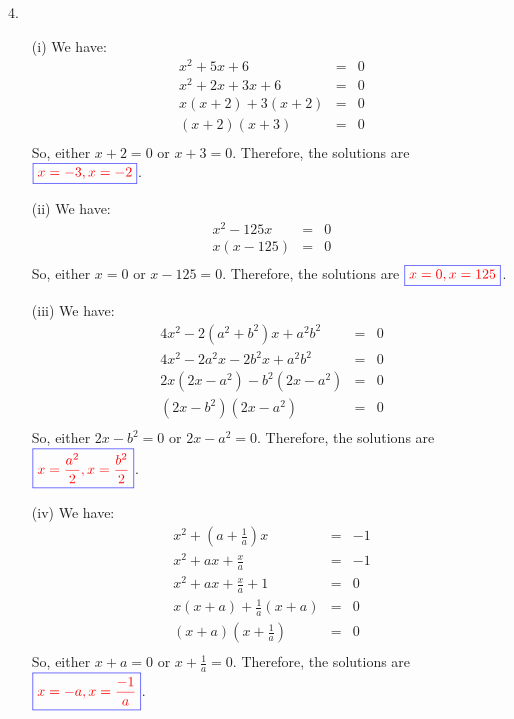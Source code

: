 \documentclass[addpoints, 12pt]{exam}
\theoremstyle{remark}
\begin{document}
4.
\begin{enumerate}
    \item [(i)] We have:
    \begin{eqnarray*}
        x^2 + 5x + 6 & = & 0 \\
        x^2 + 2x + 3x + 6 & = & 0 \\
        x(x+2) + 3(x+2) & = & 0 \\
        (x+2)(x+3) & = & 0 \\
    \end{eqnarray*}
    So, either $x+2=0$ or $x+3=0$. Therefore, the solutions are {\boldmath $\textcolor{blue}{\boxed{\textcolor{red}{x = -3,x= -2}}}$}.

    \item[(ii)] We have:
    \begin{eqnarray*}
        x^2 - 125x & = & 0 \\
        x(x-125) & = & 0 \\
    \end{eqnarray*}
    So, either $x=0$ or $x-125=0$. Therefore, the solutions are {\boldmath $\textcolor{blue}{\boxed{\textcolor{red}{x = 0,x= 125}}}$}.

    \item[(iii)] We have:
    \begin{eqnarray*}
        4x^2 - 2(a^2+b^2)x + a^2b^2 & = & 0 \\
        4x^2 - 2a^2x - 2b^2x+ a^2b^2 & = & 0 \\
        2x(2x - a^2) - b^2(2x-a^2) & = & 0 \\
        (2x - b^2)(2x-a^2) & = & 0 \\
    \end{eqnarray*}
    So, either $2x-b^2=0$ or $2x-a^2=0$. Therefore, the solutions are {\boldmath $\textcolor{blue}{\boxed{\textcolor{red}{x = \frac{a^2}{2},x= \frac{b^2}{2}}}}$}.

    \item[(iv)] We have:
    \begin{eqnarray*}
        x^2 + \left(a + \frac{1}{a}\right)x & = & -1 \\
        x^2 + ax + \frac{x}{a} & = & -1 \\
        x^2 + ax + \frac{x}{a} + 1 & = & 0 \\
        x(x+a) + \frac{1}{a}(x + a) & = & 0 \\
        (x+a)(x+\frac{1}{a}) & = & 0 \\
    \end{eqnarray*}
    So, either $x+a=0$ or $x+\frac{1}{a}=0$. Therefore, the solutions are {\boldmath $\textcolor{blue}{\boxed{\textcolor{red}{x = -a,x= \frac{-1}{a}}}}$}.
\end{enumerate}
\end{document}
